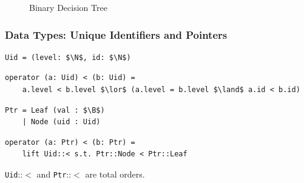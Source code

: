 \documentclass[english, aspectratio=169]{beamer}
\newcommand{\B}[0]{\ensuremath{\mathbb{B}}}
\begin{document}
\begin{frame}
{\begin{figure}
      \caption{Binary Decision Tree}
    \end{figure}
  }

\end{frame}

\begin{frame}[fragile]
  \frametitle{Data Types: Unique Identifiers and Pointers}

  \begin{lstlisting}
Uid = (level: $\N$, id: $\N$)
  \end{lstlisting}
  \begin{lstlisting}[firstnumber=2]
operator (a: Uid) < (b: Uid) =
    a.level < b.level $\lor$ (a.level = b.level $\land$ a.id < b.id)
  \end{lstlisting}

  \begin{lstlisting}[firstnumber=4]
Ptr = Leaf (val : $\B$)
    | Node (uid : Uid)
  \end{lstlisting}
  \begin{lstlisting}[firstnumber=5]
operator (a: Ptr) < (b: Ptr) =
    lift Uid::< s.t. Ptr::Node < Ptr::Leaf
  \end{lstlisting}

  \begin{lemma}
    \texttt{Uid}::$<$ and \texttt{Ptr}::$<$ are total orders.
  \end{lemma}
\end{frame}
\end{document}

